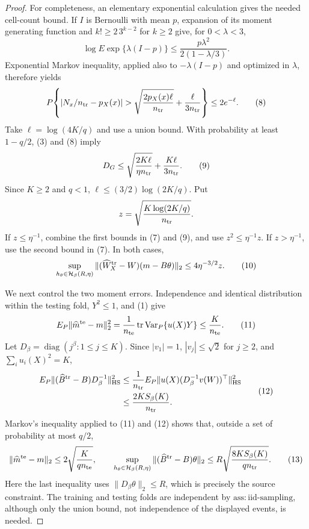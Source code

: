 \documentclass{article}
\begin{document}
\begin{proof}
For completeness, an elementary exponential calculation gives the needed cell-count bound.  If \(I\) is Bernoulli with mean \(p\), expansion of its moment generating function and \(k!\ge2\,3^{k-2}\) for \(k\ge2\) give, for \(0<\lambda<3\),
\[
 \log E\exp\{\lambda(I-p)\}
 \le \frac{p\lambda^2}{2(1-\lambda/3)}.
\]
Exponential Markov inequality, applied also to \(-\lambda(I-p)\) and optimized in \(\lambda\), therefore yields
\[
 P\!\left\{|N_x/n_{\rm tr}-p_X(x)|>
 \sqrt{\frac{2p_X(x)\ell}{n_{\rm tr}}}+\frac{\ell}{3n_{\rm tr}}\right\}
 \le2e^{-\ell}. \tag{8}
\]
Take \(\ell=\log(4K/q)\) and use a union bound.  With probability at least \(1-q/2\), (3) and (8) imply
\[
 D_G\le \sqrt{\frac{2K\ell}{\eta n_{\rm tr}}}+\frac{K\ell}{3n_{\rm tr}}. \tag{9}
\]
Since \(K\ge2\) and \(q<1\), \(\ell\le(3/2)\log(2K/q)\).  Put
\[
 z=\sqrt{\frac{K\log(2K/q)}{n_{\rm tr}}}.
\]
If \(z\le\eta^{-1}\), combine the first bounds in (7) and (9), and use \(z^2\le\eta^{-1}z\).  If \(z>\eta^{-1}\), use the second bound in (7).  In both cases,
\[
 \sup_{h_\theta\in\mathcal H_\beta(R,\eta)}
 \|(\widehat W_X^{\rm tr}-W)(m-B\theta)\|_2
 \le4\eta^{-3/2}z. \tag{10}
\]

We next control the two moment errors.  Independence and identical distribution within the testing fold, \(Y^2\le1\), and (1) give
\[
 E_P\|\widehat m^{\rm te}-m\|_2^2
 =\frac1{n_{\rm te}}\operatorname{tr}\operatorname{Var}_P\{u(X)Y\}
 \le\frac K{n_{\rm te}}. \tag{11}
\]
Let \(D_\beta=\operatorname{diag}(j^\beta:1\le j\le K)\).  Since \(|v_1|=1\), \(|v_j|\le\sqrt2\) for \(j\ge2\), and \(\sum_i u_i(X)^2=K\),
\[
 \begin{split}
 E_P\| (\widehat B^{\rm tr}-B)D_\beta^{-1}\|_{\rm HS}^2
 &\le \frac1{n_{\rm tr}}E_P\|u(X)(D_\beta^{-1}v(W))^\top\|_{\rm HS}^2\\
 &\le \frac{2KS_\beta(K)}{n_{\rm tr}}.
 \end{split}\tag{12}
\]
Markov's inequality applied to (11) and (12) shows that, outside a set of probability at most \(q/2\),
\[
 \|\widehat m^{\rm te}-m\|_2\le2\sqrt{\frac K{q n_{\rm te}}},
 \qquad
 \sup_{h_\theta\in\mathcal H_\beta(R,\eta)}
 \|(\widehat B^{\rm tr}-B)\theta\|_2
 \le R\sqrt{\frac{8KS_\beta(K)}{q n_{\rm tr}}}. \tag{13}
\]
Here the last inequality uses \(\|D_\beta\theta\|_2\le R\), which is precisely the source constraint.  The training and testing folds are independent by \(\mathrm{ass:iid\mbox{-}sampling}\), although only the union bound, not independence of the displayed events, is needed.


\end{proof}
\end{document}
